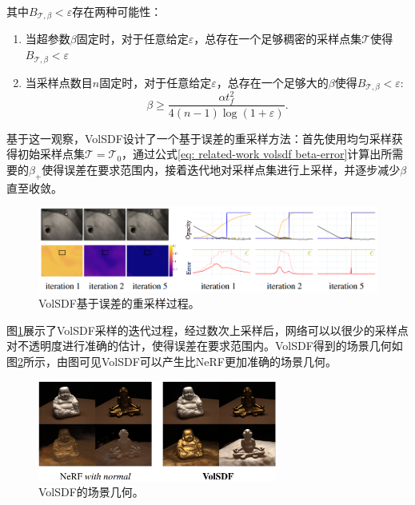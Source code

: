 其中$B_{\mathcal{T},\beta}<\varepsilon$存在两种可能性：
\begin{enumerate}
    \item 当超参数$\beta$固定时，对于任意给定$\varepsilon$，总存在一个足够稠密的采样点集$\mathcal{T}$使得$B_{\mathcal{T},\beta}<\varepsilon$
    \item 当采样点数目$n$固定时，对于任意给定$\varepsilon$，总存在一个足够大的$\beta$使得$B_{\mathcal{T},\beta}<\varepsilon$:
    \begin{equation}
        \beta\geq\frac{\alpha t_f^2}{4(n-1)\log(1+\varepsilon)}.
        \label{eq: related-work volsdf beta-error}
    \end{equation}
\end{enumerate}

基于这一观察，VolSDF设计了一个基于误差的重采样方法：首先使用均匀采样获得初始采样点集$\mathcal{T}=\mathcal{T}_0$，通过公式\ref{eq: related-work volsdf beta-error}计算出所需要的$\beta_+$使得误差在要求范围内，接着迭代地对采样点集进行上采样，并逐步减少$\beta$直至收敛。

\begin{figure}[ht]
    \centering
    \includegraphics[width=\textwidth]{undergraduate-thesis/images/volsdf-sampling.png}
    \caption{VolSDF\cite{yariv_volume_2021}基于误差的重采样过程。}
    \label{fig:related-work volsdf-sampling}
\end{figure}

图\ref{fig:related-work volsdf-sampling}展示了VolSDF采样的迭代过程，经过数次上采样后，网络可以以很少的采样点对不透明度进行准确的估计，使得误差在要求范围内。VolSDF得到的场景几何如图\ref{fig:related-work volsdf-result}所示，由图可见VolSDF可以产生比NeRF更加准确的场景几何。

\begin{figure}[h]
    \centering
    \includegraphics[width=0.7\textwidth]{undergraduate-thesis/images/volsdf-result.png}
    \caption{VolSDF\cite{yariv_volume_2021}的场景几何。}
    \label{fig:related-work volsdf-result}
\end{figure}

